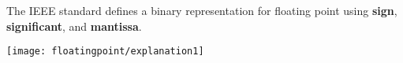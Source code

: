 \begin{blocksection}
The IEEE standard defines a binary representation for floating point using \textbf{sign}, \textbf{significant}, and \textbf{mantissa}.

\texttt{[image: floatingpoint/explanation1]}

\end{blocksection}